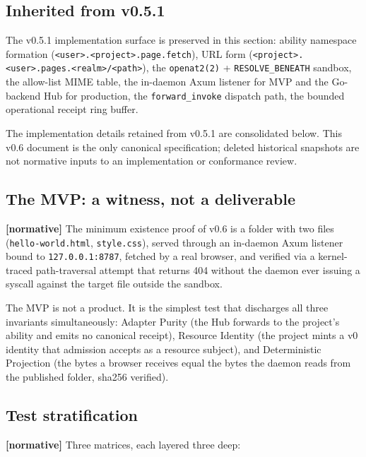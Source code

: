 \documentclass[11pt,a4paper]{article}
\newcommand{\normsv}{\textcolor{normativecolor}{\textbf{[normative]}}\xspace}
\theoremstyle{definition}
\begin{document}
\subsection{Inherited from v0.5.1}

The v0.5.1 implementation surface is preserved in this
section: ability namespace formation
(\texttt{<user>.<project>.page.fetch}), URL form
(\texttt{<project>.<user>.pages.<realm>/<path>}), the
\texttt{openat2(2)} + \texttt{RESOLVE\_BENEATH} sandbox, the
allow-list MIME table, the in-daemon Axum listener for MVP and
the Go-backend Hub for production, the
\texttt{forward\_invoke} dispatch path, the bounded operational
receipt ring buffer.

The implementation details retained from v0.5.1 are consolidated
below. This v0.6 document is the only canonical specification;
deleted historical snapshots are not normative inputs to an
implementation or conformance review.

\subsection{The MVP: a witness, not a deliverable}

\normsv{} The minimum existence proof of v0.6 is a folder with
two files (\texttt{hello-world.html}, \texttt{style.css}),
served through an in-daemon Axum listener bound to
\texttt{127.0.0.1:8787}, fetched by a real browser, and
verified via a kernel-traced path-traversal attempt that
returns 404 without the daemon ever issuing a syscall against
the target file outside the sandbox.

The MVP is not a product. It is the simplest test that
discharges all three invariants simultaneously: Adapter Purity
(the Hub forwards to the project's ability and emits no
canonical receipt), Resource Identity (the project mints a v0
identity that admission accepts as a resource subject), and
Deterministic Projection (the bytes a browser receives equal
the bytes the daemon reads from the published folder, sha256
verified).

\subsection{Test stratification}

\normsv{} Three matrices, each layered three deep:
\end{document}
